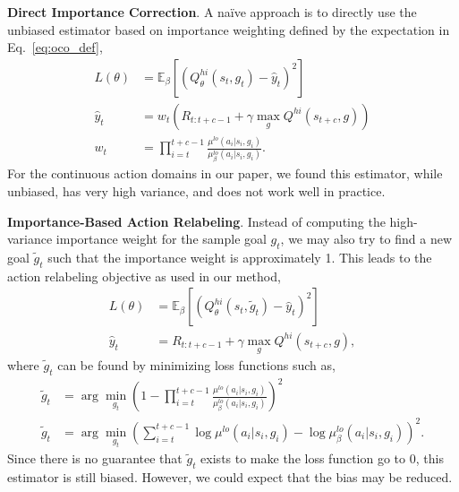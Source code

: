 \documentclass{article}
\begin{document}
\textbf{Direct Importance Correction}.
A na\"{i}ve approach is to directly use the unbiased estimator based on importance weighting defined by the expectation in Eq.~\ref{eq:oco_def},
\begin{align}
 L(\theta) &= \mathbb{E}_{\beta}\left[ \left( Q_\theta^{hi}(s_t,g_t)  - \hat{y}_t\right)^2 \right] \\
 \hat{y}_t &= w_t\left(R_{t:t+c-1} + \gamma \max_{g} Q^{hi} (s_{t+c},g)\right)\\
w_t &= \prod_{i=t}^{t+c-1} \frac{\mu^{lo}(a_i|s_i,g_i)}{\mu_\beta^{lo}(a_i|s_i,g_i)}.
\end{align}
For the continuous action domains in our paper, we found this estimator, while unbiased, has very high variance, and does not work well in practice.

\textbf{Importance-Based Action Relabeling}.
Instead of computing the high-variance importance weight for the sample goal $g_t$, we may also try to find a new goal $\tilde{g}_t$ such that the importance weight is approximately 1. This leads to the action relabeling objective as used in our method,
\begin{align}
 L(\theta) &= \mathbb{E}_{\beta}\left[ \left( Q_\theta^{hi}(s_t,\tilde{g}_t)  - \hat{y}_t\right)^2 \right] \\ \label{eq:act_reb}
 \hat{y}_t &= R_{t:t+c-1} + \gamma \max_{g} Q^{hi} (s_{t+c},g),
\end{align}
where $\tilde{g}_t$ can be found by minimizing loss functions such as,
\begin{align}
 \tilde{g}_t& = \arg\min_{g_t}\left(1-\prod_{i=t}^{t+c-1} \frac{\mu^{lo}(a_i|s_i,g_i)}{\mu_\beta^{lo}(a_i|s_i,g_i)}\right)^2\\
 \tilde{g}_t &= \arg\min_{g_t} \left(\sum_{i=t}^{t+c-1} \log \mu^{lo}(a_i|s_i,g_i)-\log\mu_\beta^{lo}(a_i|s_i,g_i)\right)^2.\label{eq:imp_act_reb} 
\end{align}
Since there is no guarantee that $\tilde{g}_t$ exists to make the loss function go to 0, this estimator is still biased. However, we could expect that the bias may be reduced.
\end{document}
